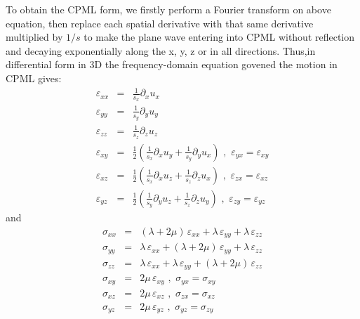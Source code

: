 \documentclass[onecolumn,extra]{gji_modified_cours_UPPA}
\begin{document}
%
\clearpage
%
%
\noindent To obtain the CPML form, we firstly perform a Fourier transform on above equation,
then replace each spatial derivative with that same derivative multiplied by $1/s$
to make the plane wave entering into CPML without reflection and decaying exponentially along the x, y, z or in all directions.
Thus,in differential form in 3D the frequency-domain equation govened the motion in CPML gives:
%
\begin{eqnarray}
\varepsilon_{xx} & = & \frac{1}{s_x}\partial_x u_x \nonumber \\
\varepsilon_{yy} & = & \frac{1}{s_y}\partial_y u_y \nonumber \\
\varepsilon_{zz} & = & \frac{1}{s_z}\partial_z u_z \nonumber \\
\varepsilon_{xy} & = & \frac{1}{2} (\frac{1}{s_x} \partial_x u_y + \frac{1}{s_y} \partial_y u_x) \,\, , \,\, \varepsilon_{yx} =  \varepsilon_{xy} \nonumber \\
\varepsilon_{xz} & = & \frac{1}{2} (\frac{1}{s_x} \partial_x u_z + \frac{1}{s_z} \partial_z u_x) \,\, , \,\, \varepsilon_{zx} =  \varepsilon_{xz} \nonumber \\
\varepsilon_{yz} & = & \frac{1}{2} (\frac{1}{s_y} \partial_y u_z + \frac{1}{s_z} \partial_z u_y) \,\, , \,\, \varepsilon_{zy} =  \varepsilon_{yz}
\end{eqnarray}
%
\noindent and
%
\begin{eqnarray}
\sigma_{xx} & = & (\lambda + 2 \mu) \, \varepsilon_{xx} + \lambda \, \varepsilon_{yy} + \lambda \, \varepsilon_{zz} \nonumber \\
\sigma_{yy} & = & \lambda \, \varepsilon_{xx} + (\lambda + 2 \mu) \, \varepsilon_{yy} + \lambda \, \varepsilon_{zz} \nonumber \\
\sigma_{zz} & = & \lambda \, \varepsilon_{xx} + \lambda \, \varepsilon_{yy} + (\lambda + 2 \mu) \, \varepsilon_{zz} \nonumber \\
\sigma_{xy} & = & 2 \mu \, \varepsilon_{xy} \,\, , \,\, \sigma_{yx} =  \sigma_{xy} \nonumber \\
\sigma_{xz} & = & 2 \mu \, \varepsilon_{xz} \,\, , \,\, \sigma_{zx} =  \sigma_{xz} \nonumber \\
\sigma_{yz} & = & 2 \mu \, \varepsilon_{yz} \,\, , \,\, \sigma_{yz} =  \sigma_{zy}
\end{eqnarray}
\end{document}
